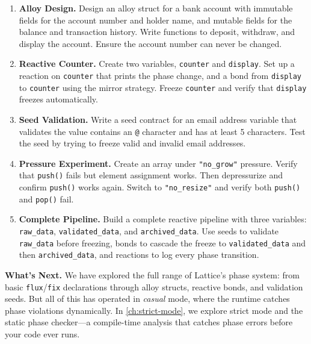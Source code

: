 \begin{enumerate}
  \item \textbf{Alloy Design.}
    Design an alloy struct for a bank account with immutable fields for the account number and holder name, and mutable fields for the balance and transaction history.
    Write functions to deposit, withdraw, and display the account.
    Ensure the account number can never be changed.

  \item \textbf{Reactive Counter.}
    Create two variables, \lstinline|counter| and \lstinline|display|.
    Set up a reaction on \lstinline|counter| that prints the phase change, and a bond from \lstinline|display| to \lstinline|counter| using the mirror strategy.
    Freeze \lstinline|counter| and verify that \lstinline|display| freezes automatically.

  \item \textbf{Seed Validation.}
    Write a seed contract for an email address variable that validates the value contains an \lstinline|@| character and has at least 5 characters.
    Test the seed by trying to freeze valid and invalid email addresses.

  \item \textbf{Pressure Experiment.}
    Create an array under \lstinline|"no_grow"| pressure.
    Verify that \lstinline|push()| fails but element assignment works.
    Then depressurize and confirm \lstinline|push()| works again.
    Switch to \lstinline|"no_resize"| and verify both \lstinline|push()| and \lstinline|pop()| fail.

  \item \textbf{Complete Pipeline.}
    Build a complete reactive pipeline with three variables: \lstinline|raw_data|, \lstinline|validated_data|, and \lstinline|archived_data|.
    Use seeds to validate \lstinline|raw_data| before freezing, bonds to cascade the freeze to \lstinline|validated_data| and then \lstinline|archived_data|, and reactions to log every phase transition.
\end{enumerate}

\bigskip

\noindent\textbf{What's Next.}\quad
We have explored the full range of Lattice's phase system: from basic \lstinline|flux|/\lstinline|fix| declarations through alloy structs, reactive bonds, and validation seeds.
But all of this has operated in \emph{casual} mode, where the runtime catches phase violations dynamically.
In \cref{ch:strict-mode}, we explore strict mode and the static phase checker---a compile-time analysis that catches phase errors before your code ever runs.

